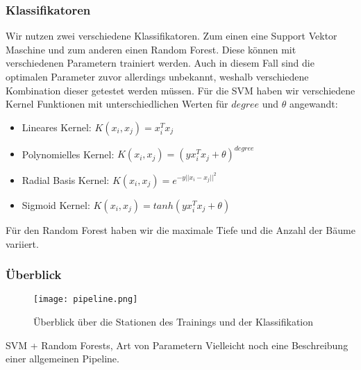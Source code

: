 \subsubsection{Klassifikatoren}
Wir nutzen zwei verschiedene Klassifikatoren. Zum einen eine Support Vektor Maschine und zum anderen einen Random Forest.
Diese können mit verschiedenen Parametern trainiert werden. Auch in diesem Fall sind die optimalen Parameter zuvor allerdings unbekannt,
weshalb verschiedene Kombination dieser getestet werden müssen.\newline
Für die SVM haben wir verschiedene Kernel Funktionen mit unterschiedlichen Werten für $degree$ und $\theta$ angewandt:
\begin{itemize}
  \item Lineares Kernel: $K(x_i,x_j) = x_i^Tx_j$
  \item Polynomielles Kernel: $K(x_i,x_j) = (yx_i^Tx_j + \theta)^{degree}$
  \item Radial Basis Kernel: $K(x_i,x_j) = e^{-y||x_i-x_j||^2}$
  \item Sigmoid Kernel: $K(x_i,x_j) = tanh(yx_i^Tx_j + \theta)$
\end{itemize}

Für den Random Forest haben wir die maximale Tiefe und die Anzahl der Bäume variiert.


\subsubsection{Überblick}
\begin{figure}
\begin{center}
\texttt{[image: pipeline.png]}
\caption{Überblick über die Stationen des Trainings und der Klassifikation}
\end{center}
\label{fig:timediff}
\end{figure}

SVM + Random Forests, Art von Parametern
Vielleicht noch eine Beschreibung einer allgemeinen Pipeline.


